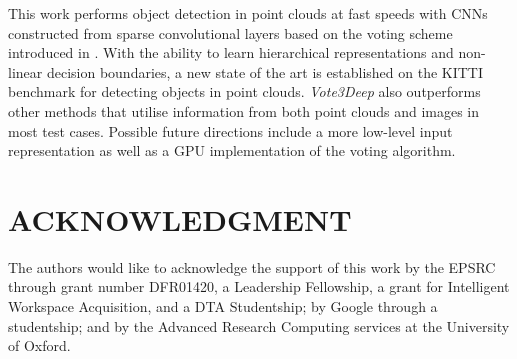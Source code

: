 \documentclass[letterpaper, 10 pt, conference]{tex_style/ieeeconf}
\begin{document}
This work performs object detection in point clouds at fast speeds with CNNs constructed from sparse convolutional layers based on the voting scheme introduced in \cite{wang2015voting}.
With the ability to learn hierarchical representations and non-linear decision boundaries, a new state of the art is established on the KITTI benchmark for detecting objects in point clouds.
\emph{Vote3Deep} also outperforms other methods that utilise information from both point clouds and images in most test cases.
Possible future directions include a more low-level input representation as well as a GPU implementation of the voting algorithm. 
\balance


\section*{ACKNOWLEDGMENT}

The authors would like to acknowledge the support of this work by the EPSRC through grant number DFR01420, a Leadership Fellowship, a grant for Intelligent Workspace Acquisition, and a DTA Studentship; by Google through a studentship; and by the Advanced Research Computing services at the University of Oxford.
                                  


\end{document}
